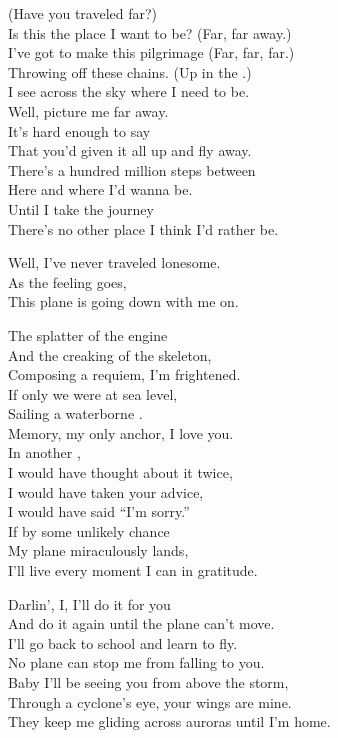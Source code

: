 (Have you traveled far?) \\
Is this the place I want to be? (Far, far away.) \\
I've got to make this pilgrimage (Far, far, far.) \\
Throwing off these chains. (Up in the .) \\
I see across the sky where I need to be. \\

Well, picture me far away. \\
It's hard enough to say \\
That you'd given it all up and fly away. \\
There's a hundred million steps between \\
Here and where I'd wanna be. \\
Until I take the journey \\
There's no other place I think I'd rather be. \\


Well, I've never traveled lonesome. \\
As the feeling goes, \\
This plane is going down with me on. \\


The splatter of the engine \\
And the creaking of the skeleton, \\
Composing a requiem, I'm frightened. \\
If only we were at sea level, \\
Sailing a waterborne . \\
Memory, my only anchor, I love you. \\

In another , \\
I would have thought about it twice, \\
I would have taken your advice, \\
I would have said ``I'm sorry.'' \\
If by some unlikely chance \\
My plane miraculously lands, \\
I'll live every moment I can in gratitude. \\


Darlin', I, I'll do it for you \\
And do it again until the plane can't move. \\
I'll go back to school and learn to fly. \\
No plane can stop me from falling to you. \\
Baby I'll be seeing you from above the storm, \\
Through a cyclone's eye, your wings are mine. \\
They keep me gliding across auroras until I'm home. \\

